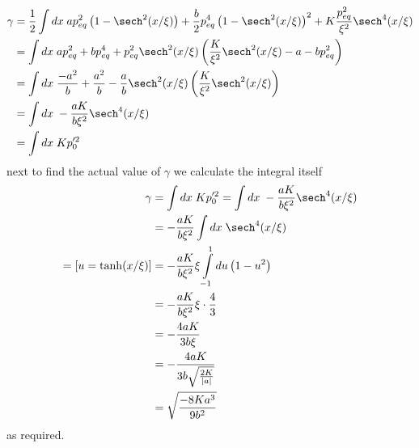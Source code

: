\begin{align}
	\gamma &= \frac{1}{2}\int dx \; ap_{eq}^2\ins{1-\sech^2(x/\xi)}+\frac{b}{2}p_{eq}^4\ins{1-\sech^2(x/\xi)}^2+K\frac{p_{eq}^2}{\xi^2}\sech^4(x/\xi)\\
	&= \int dx \; ap_{eq}^2+bp_{eq}^4+p_{eq}^2\sech^2(x/\xi)\ins{\frac{K}{\xi^2}\sech^2(x/\xi)-a-bp_{eq}^2}\\
	&= \int dx \; \frac{-a^2}{b}+\frac{a^2}{b}-\frac{a}{b}\sech^2(x/\xi)\ins{\frac{K}{\xi^2}\sech^2(x/\xi)}\\
	&= \int dx \; -\frac{aK}{b\xi^2}\sech^4(x/\xi)\\
	&= \int dx \; Kp_0'^2
\end{align}
next to find the actual value of $\gamma$ we calculate the integral itself
\begin{align}
	\gamma &= \int dx \; Kp_0'^2=\int dx \; -\frac{aK}{b\xi^2}\sech^4(x/\xi)\\
	&= -\frac{aK}{b\xi^2}\int dx \; \sech^4(x/\xi)\\
	=[u=\tanh(x/\xi)]&= -\frac{aK}{b\xi^2}\xi\int\limits_{-1}^1 du \ins{1-u^2}\\
	&= -\frac{aK}{b\xi^2} \xi \cdot\frac{4}{3}\\
	&= -\frac{4aK}{3b\xi}\\
	&= -\frac{4aK}{3b\sqrt{\frac{2K}{\lvert a \rvert}}}\\
	&= \sqrt{\frac{-8Ka^3}{9b^2}}
\end{align}
as required.